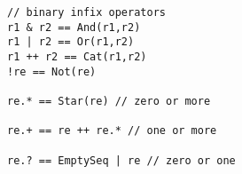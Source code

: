 \begin{lstlisting}[style=scalaioScala]
// binary infix operators
r1 & r2 == And(r1,r2)
r1 | r2 == Or(r1,r2)
r1 ++ r2 == Cat(r1,r2)
!re == Not(re)

re.* == Star(re) // zero or more

re.+ == re ++ re.* // one or more

re.? == EmptySeq | re // zero or one
\end{lstlisting}
